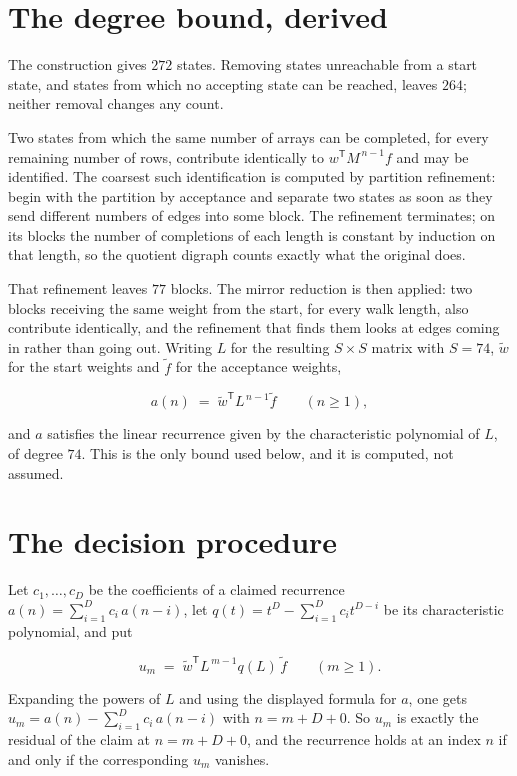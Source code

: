 \documentclass[11pt]{article}
\theoremstyle{definition}
\begin{document}
\section{The degree bound, derived}

The construction gives $272$ states. Removing states unreachable from a start state, and states from which no accepting state can be reached, leaves $264$; neither removal changes any count.

Two states from which the same number of arrays can be completed, for every remaining number of rows, contribute identically to $w^{\mathsf T}M^{\,n-1}f$ and may be identified. The coarsest such identification is computed by partition refinement: begin with the partition by acceptance and separate two states as soon as they send different numbers of edges into some block. The refinement terminates; on its blocks the number of completions of each length is constant by induction on that length, so the quotient digraph counts exactly what the original does.

That refinement leaves $77$ blocks. The mirror reduction is then applied: two blocks receiving the same weight from the start, for every walk length, also contribute identically, and the refinement that finds them looks at edges coming in rather than going out. Writing $L$ for the resulting $S \times S$ matrix with $S = 74$, $\tilde w$ for the start weights and $\tilde f$ for the acceptance weights,

\[a(n) \;=\; \tilde w^{\mathsf T} L^{\,n-1} \tilde f \qquad (n \ge 1),\]

and $a$ satisfies the linear recurrence given by the characteristic polynomial of $L$, of degree $74$. This is the only bound used below, and it is computed, not assumed.

\section{The decision procedure}

Let $c_1,\dots,c_D$ be the coefficients of a claimed recurrence $a(n) = \sum_{i=1}^{D} c_i\,a(n-i)$, let $q(t) = t^{D} - \sum_{i=1}^{D} c_i t^{D-i}$ be its characteristic polynomial, and put

\[u_m \;=\; \tilde w^{\mathsf T} L^{\,m-1} q(L)\,\tilde f \qquad (m \ge 1).\]

Expanding the powers of $L$ and using the displayed formula for $a$, one gets $u_m = a(n) - \sum_{i=1}^{D} c_i\,a(n-i)$ with $n = m + D + 0$. So $u_m$ is exactly the residual of the claim at $n = m + D + 0$, and the recurrence holds at an index $n$ if and only if the corresponding $u_m$ vanishes.
\end{document}
